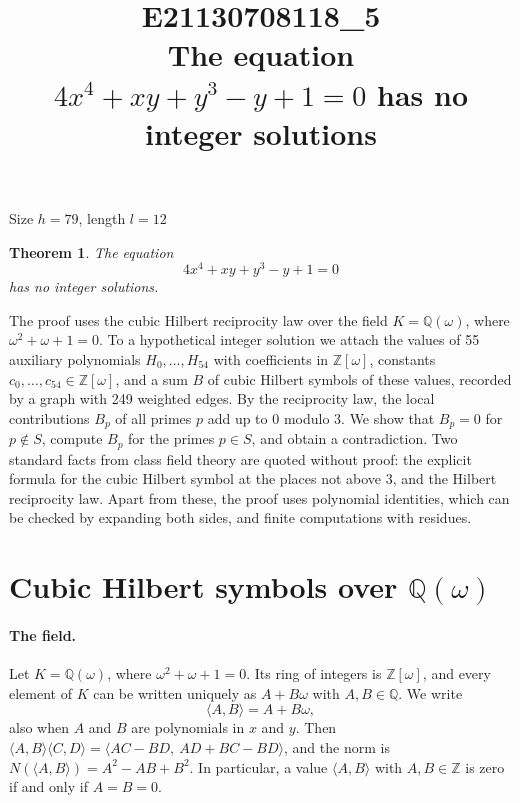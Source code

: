 \documentclass[11pt]{article}
\title{\textbf{E21130708118\_5}\\[4pt] {\Large The equation $4x^{4}+xy+y^{3}-y+1=0$ has no integer solutions}}
\author{}
\date{}
\newtheorem{theorem}{Theorem}
\newcommand{\Z}{\mathbb{Z}}
\newcommand{\Q}{\mathbb{Q}}
\begin{document}
\maketitle
\vspace{-8ex}
\begin{center}
Size $h=79$, length $l=12$
\end{center}

\begin{theorem}\label{thm:main}
The equation
\begin{equation}\label{eq:main}
4x^{4}+xy+y^{3}-y+1=0
\end{equation}
has no integer solutions.
\end{theorem}

The proof uses the cubic Hilbert reciprocity law over the field $K=\Q(\omega)$, where $\omega^2+\omega+1=0$. To a hypothetical integer solution we attach the values of 55 auxiliary polynomials $H_0,\dots,H_{54}$ with coefficients in $\Z[\omega]$, constants $c_0,\dots,c_{54}\in\Z[\omega]$, and a sum $B$ of cubic Hilbert symbols of these values, recorded by a graph with 249 weighted edges. By the reciprocity law, the local contributions $B_p$ of all primes $p$ add up to $0$ modulo $3$. We show that $B_p=0$ for $p\notin S$, compute $B_p$ for the primes $p\in S$, and obtain a contradiction. Two standard facts from class field theory are quoted without proof: the explicit formula for the cubic Hilbert symbol at the places not above $3$, and the Hilbert reciprocity law. Apart from these, the proof uses polynomial identities, which can be checked by expanding both sides, and finite computations with residues.


\section{\texorpdfstring{Cubic Hilbert symbols over $\Q(\omega)$}{Cubic Hilbert symbols over Q(w)}}\label{sec:symbols}

\paragraph{The field.} Let $K=\Q(\omega)$, where $\omega^2+\omega+1=0$. Its ring of integers is $\Z[\omega]$, and every element of $K$ can be written uniquely as $A+B\omega$ with $A,B\in\Q$. We write
\[
\langle A,B\rangle=A+B\omega,
\]
also when $A$ and $B$ are polynomials in $x$ and $y$. Then $\langle A,B\rangle\langle C,D\rangle=\langle AC-BD,\ AD+BC-BD\rangle$, and the norm is $N(\langle A,B\rangle)=A^2-AB+B^2$. In particular, a value $\langle A,B\rangle$ with $A,B\in\Z$ is zero if and only if $A=B=0$.
\end{document}
